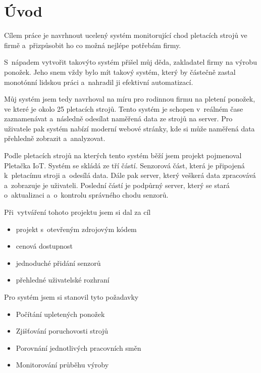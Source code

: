 \chapter*{Úvod}
Cílem práce je navrhnout ucelený systém monitorující chod pletacích strojů ve firmě a~přizpůsobit ho co možná nejlépe potřebám firmy.

S~nápadem vytvořit takovýto systém přišel můj děda, zakladatel firmy na výrobu ponožek.
Jeho snem vždy bylo mít takový systém, který by částečně zastal monotónní lidskou práci a~nahradil ji efektivní automatizací.

Můj systém jsem tedy navrhoval na míru pro rodinnou firmu na pletení ponožek, ve které je okolo 25 pletacích strojů. 
Tento systém je schopen v~reálném čase zaznamenávat a~následně odesílat naměřená data ze strojů na server. 
Pro uživatele pak systém nabízí moderní webové stránky, kde si může naměřená data přehledně zobrazit a~analyzovat.

Podle pletacích strojů na kterých tento systém běží jsem projekt pojmenoval Pletačka IoT. 
Systém se skládá ze tří částí. Senzorová část, která je připojená k~pletacímu stroji a~odesílá data.
Dále pak server, který veškerá data zpracovává a~zobrazuje je uživateli.
Poslední částí je podpůrný server, který se stará o~aktualizaci a~o~kontrolu správného chodu senzorů.\newline


Při~vytváření tohoto projektu jsem si dal za cíl
\begin{itemize}
    \item projekt s~otevřeným zdrojovým kódem
    \item cenová dostupnost
    \item jednoduché přidání senzorů
    \item přehledné uživatelské rozhraní
\end{itemize}

Pro systém jsem si stanovil tyto požadavky
\begin{itemize}
    \item Počítání upletených ponožek
    \item Zjišťování poruchovosti strojů
    \item Porovnání jednotlivých pracovních směn
    \item Monitorování průběhu výroby
\end{itemize}

\newpage
